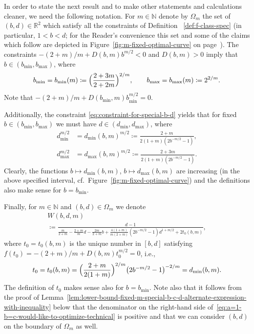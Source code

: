 \documentclass[a4paper]{amsart} %
\theoremstyle{definition}
\theoremstyle{remark}
\numberwithin{equation}{section}
\newcommand*{\RR}{\mathbb{R}}
\newcommand*{\NN}{\mathbb{N}}
\newcommand*{\dOne}{D}%
\newcommand*{\specialbd}[1]{\Omega_{#1}}
\newcommand*{\XXXspecialbd}{W}
\newcommand*{\bMin}{b_{\min}}
\newcommand*{\bMax}{b_{\max}}
\newcommand*{\dMin}{d_{\min}}
\newcommand*{\dMax}{d_{\max}}
\begin{document}
In order to state the next result and to make other statements and calculations cleaner, 
we need the following notation.
For $m\in\NN$ denote by $\specialbd{m}$
the set of $(b,d)\in\RR^2$ which satisfy all the constraints of Definition ~\ref{def:f-class-spec} (in particular, $1<b<d$;
for the Reader's convenience
this set 
and some of the claims which follow
are depicted in Figure~\ref{fig:m-fixed-optimal-curve} on page~\pageref{fig:m-fixed-optimal-curve}).
The constraints 
$-(2+m)/m + \dOne(b,m) b^{m/2} <0$ and $\dOne(b,m) >0$
imply that $b\in (\bMin, \bMax)$, where
\begin{equation}
\label{eq:def-bMin-bMax}
\bMin = \bMin(m)\coloneqq \Bigl(\frac{2+3m}{2+2m}\Bigr)^{2/m},
\qquad
\bMax = \bMax(m) \coloneqq 2^{2/m}.
\end{equation}
Note that 
$-(2+m)/m + \dOne(\bMin,m) \bMin^{m/2} = 0$.

Additionally, the constraint \eqref{eq:constraint-for-special-b-d} yields
that for fixed $b\in (\bMin, \bMax)$ we must have
$d\in (\dMin, \dMax)$,
where
\begin{align}
\label{eq:def-dMin}
\dMin ^{m/2} &= \dMin(b,m)^{m/2} 
\coloneqq \frac{2+m}{ 2(1+m) (2b^{-m/2}  -1)},\\
\label{eq:def-dMax}
\dMax^{m/2} &= \dMax(b,m)^{m/2} \coloneqq \frac{2+3m}{ 2(1+m) (2b^{-m/2}  -1)}.
\end{align}
Clearly, the functions
$b\mapsto \dMin(b,m)$,
$b\mapsto \dMax(b,m)$
are increasing (in the above specified interval, cf.~Figure~\ref{fig:m-fixed-optimal-curve})
and the definitions also make sense for $b= \bMin$.




Finally, for $m\in\NN$ and $(b,d)\in\specialbd{m}$ 
we denote
\begin{multline}
\label{eq:a=1-b=c-would-like-to-optimize-technical}
\XXXspecialbd(b,d,m)\\
\coloneqq \frac{d-1}{ \frac{m}{2+m} -\frac{2+m}{m}d - \frac{2m}{2+m}b +
\frac{4(1+m)}{m(2+m)}(2b^{-m/2}  -1)d^{1+m/2} 
+2t_0(b,m)},
\end{multline}
where  $t_0 = t_0(b,m)$ is the unique number in $[b,d]$ satisfying
$f(t_0) = -(2+m)/m + \dOne(b,m) t_0 ^{m/2} = 0$,
i.e.,
\begin{equation}
\label{eq:def-t_0-explicit-formula}
t_0 =  t_0(b,m) = \Bigl(\frac{2+m}{2(1+m)}\Bigr)^{2/m} \bigl(2 b^{-m/2} -1\bigr)^{-2/m} = \dMin(b,m).
\end{equation}
The definition of $t_0$ makes sense also for $b=\bMin$.
Note also that it follows from the proof of Lemma~\ref{lem:lower-bound-fixed-m-special-b-c-d-alternate-expression-with-inequality}
below that the denominator on the right-hand side of~\eqref{eq:a=1-b=c-would-like-to-optimize-technical} is positive and that we can consider $(b,d)$ on the boundary of $\specialbd{m}$ as well.
\end{document}
